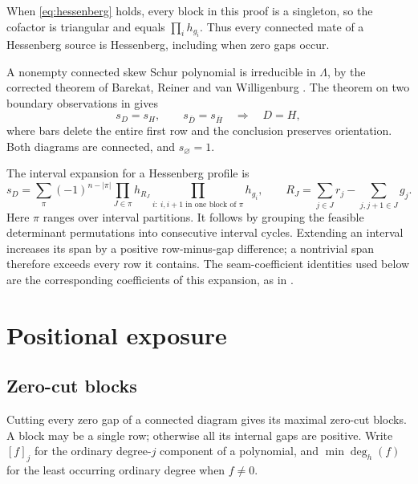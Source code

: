 \documentclass[11pt,a4paper]{amsart}
\numberwithin{equation}{section}
\theoremstyle{plain}
\theoremstyle{definition}
\begin{document}
When \eqref{eq:hessenberg} holds, every block in this proof is a singleton, so the cofactor is triangular and equals \(\prod_i h_{g_i}\).  Thus every connected mate of a Hessenberg source is Hessenberg, including when zero gaps occur.

A nonempty connected skew Schur polynomial is irreducible in \(\Lambda\), by the corrected theorem of Barekat, Reiner and van Willigenburg \cite{Barekat2009CoincidencesCorrigendum}.  The theorem on two boundary observations in \cite{Shields2026SkewSchur} gives
\begin{equation}\label{eq:boundary-input}
 s_D=s_H,\qquad s_{\bar D}=s_{\bar H}
 \quad\Longrightarrow\quad D=H,
\end{equation}
where bars delete the entire first row and the conclusion preserves orientation.  Both diagrams are connected, and \(s_\varnothing=1\).

The interval expansion for a Hessenberg profile is
\begin{equation}\label{eq:interval}
 s_D=\sum_\pi(-1)^{n-|\pi|}
 \prod_{J\in\pi}h_{R_J}
 \prod_{i:\ i,i+1\text{ in one block of }\pi}h_{g_i},\qquad
 R_J=\sum_{j\in J}r_j-\sum_{j,j+1\in J}g_j.
\end{equation}
Here \(\pi\) ranges over interval partitions.  It follows by grouping the feasible determinant permutations into consecutive interval cycles.  Extending an interval increases its span by a positive row-minus-gap difference; a nontrivial span therefore exceeds every row it contains.  The seam-coefficient identities used below are the corresponding coefficients of this expansion, as in \cite{Shields2026Inflation}.

\section{Positional exposure}\label{sec:exposure}

\subsection{Zero-cut blocks}

Cutting every zero gap of a connected diagram gives its maximal zero-cut blocks.  A block may be a single row; otherwise all its internal gaps are positive.  Write \([f]_j\) for the ordinary degree-\(j\) component of a polynomial, and \(\min\deg_h(f)\) for the least occurring ordinary degree when \(f\ne0\).
\end{document}
